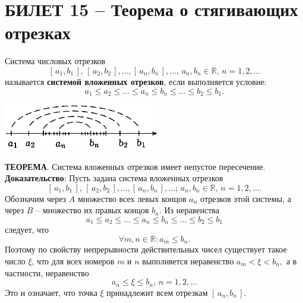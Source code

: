 \documentclass{article}
\newcommand{\R}{\mathbb R}
\begin{document}
\section{БИЛЕТ 15 -- Теорема о стягивающих отрезках}
Система числовых отрезков
$$ [\,a_{1},b_{1}\,],\,[\,a_{2},b_{2}\,],\ldots,[\,a_{n},b_{n}\,],\ldots,\, a_{n},b_{n}\in\R,\,n=1,2,\ldots  $$
называется \textbf{системой вложенных отрезков}, если выполняется условие:
$$ a_{1}\leqslant a_{2}\leqslant\ldots\leqslant a_{n}\leqslant b_{n}\leqslant\ldots\leqslant b_{2}\leqslant b_{1}. $$
\begin{center}
    \includegraphics[scale=1]{8.jpg}
\end{center}
\textbf{ТЕОРЕМА}. Система вложенных отрезков имеет непустое пересечение.
\newline
\newline
\textbf{Доказательство}:
\newline
\newline
Пусть задана система вложенных отрезков 
$$ [\,a_{1},b_{1}\,],\,[\,a_{2},b_{2}\,],\ldots,[\,a_{n},b_{n}\,],\ldots;\, a_{n},b_{n}\in\R,\,n=1,2,\ldots.  $$
Обозначим через $A$ множество всех левых концов $a_{n}$ отрезков этой системы, а через $B$ -- множество их правых концов $b_{n}$. Из неравенства
$$ a_{1}\leqslant a_{2}\leqslant\ldots\leqslant a_{n}\leqslant b_{n}\leqslant\ldots\leqslant b_{2}\leqslant b_{1} $$
следует, что 
$$ \forall m,n\in\R:a_{m}\leqslant b_{n}. $$
Поэтому по свойству непрерывности действительных чисел существует такое число $\xi$, что для всех номеров $m$ и $n$ выполняется неравенство $a_{m}<\xi<b_{n}, $ а в частности, неравенство $$a_{n}\leqslant\xi\leqslant b_{n},\,n=1,2,\ldots$$
Это и означает, что точка $\xi$ принадлежит всем отрезкам $ [\,a_{n},b_{n}\,] $.

\newpage
\end{document}
